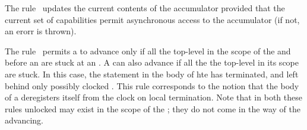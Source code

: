 The rule~ updates the current contents of the
accumulator provided that the current set of capabilities permit
asynchronous access to the accumulator (if not, an erorr is thrown).

The rule~ permits a  to advance
only if all the top-level  in the scope of the
 and before an  are stuck at an
. A  can also advance if all the
the top-level  in its scope are stuck. In this
case, the statement in the body of hte  has
terminated, and left behind only possibly clocked . This
rule corresponds to the notion that the body of a  deregisters itself from the clock on local termination.
Note that in both these rules unlocked  may exist in the
scope of the ; they do not come in the way of the
 advancing.

